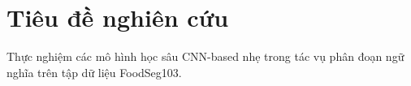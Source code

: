 \section{Tiêu đề nghiên cứu}
\label{summary}


Thực nghiệm các mô hình học sâu CNN-based nhẹ trong tác vụ phân đoạn ngữ nghĩa trên tập dữ liệu FoodSeg103.

